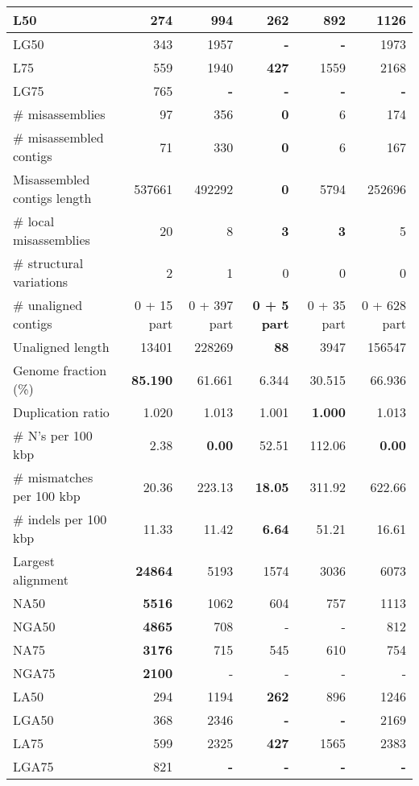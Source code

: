 \documentclass[12pt,a4paper]{article}
\begin{document}
\begin{table}[ht]
\begin{center}
\begin{tabular}{|l*{5}{|r}|}
L50 & 274 & 994 & {\bf 262} & 892 & 1126 \\ \hline
LG50 & 343 & 1957 & {\bf -} & {\bf -} & 1973 \\ \hline
L75 & 559 & 1940 & {\bf 427} & 1559 & 2168 \\ \hline
LG75 & 765 & {\bf -} & {\bf -} & {\bf -} & {\bf -} \\ \hline
\# misassemblies & 97 & 356 & {\bf 0} & 6 & 174 \\ \hline
\# misassembled contigs & 71 & 330 & {\bf 0} & 6 & 167 \\ \hline
Misassembled contigs length & 537661 & 492292 & {\bf 0} & 5794 & 252696 \\ \hline
\# local misassemblies & 20 & 8 & {\bf 3} & {\bf 3} & 5 \\ \hline
\# structural variations & 2 & 1 & 0 & 0 & 0 \\ \hline
\# unaligned contigs & 0 + 15 part & 0 + 397 part & {\bf 0 + 5 part} & 0 + 35 part & 0 + 628 part \\ \hline
Unaligned length & 13401 & 228269 & {\bf 88} & 3947 & 156547 \\ \hline
Genome fraction (\%) & {\bf 85.190} & 61.661 & 6.344 & 30.515 & 66.936 \\ \hline
Duplication ratio & 1.020 & 1.013 & 1.001 & {\bf 1.000} & 1.013 \\ \hline
\# N's per 100 kbp & 2.38 & {\bf 0.00} & 52.51 & 112.06 & {\bf 0.00} \\ \hline
\# mismatches per 100 kbp & 20.36 & 223.13 & {\bf 18.05} & 311.92 & 622.66 \\ \hline
\# indels per 100 kbp & 11.33 & 11.42 & {\bf 6.64} & 51.21 & 16.61 \\ \hline
Largest alignment & {\bf 24864} & 5193 & 1574 & 3036 & 6073 \\ \hline
NA50 & {\bf 5516} & 1062 & 604 & 757 & 1113 \\ \hline
NGA50 & {\bf 4865} & 708 & - & - & 812 \\ \hline
NA75 & {\bf 3176} & 715 & 545 & 610 & 754 \\ \hline
NGA75 & {\bf 2100} & - & - & - & - \\ \hline
LA50 & 294 & 1194 & {\bf 262} & 896 & 1246 \\ \hline
LGA50 & 368 & 2346 & {\bf -} & {\bf -} & 2169 \\ \hline
LA75 & 599 & 2325 & {\bf 427} & 1565 & 2383 \\ \hline
LGA75 & 821 & {\bf -} & {\bf -} & {\bf -} & {\bf -} \\ \hline
\end{tabular}
\end{center}
\end{table}
\end{document}
